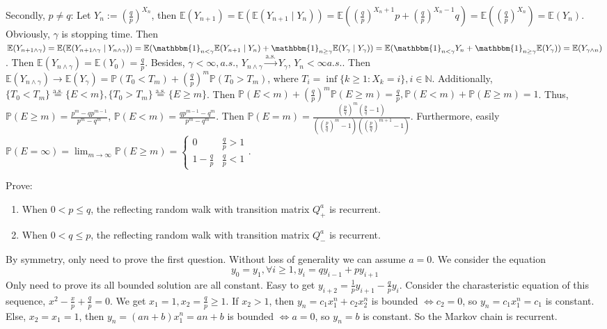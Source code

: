 \documentclass{ctexart}
\begin{document}
\begin{solution}
  Secondly, \(p \neq q\): Let \(Y_n:=(\frac{q}{p})^{X_n}\), then \(\mathbb{E}(Y_{n + 1})=\mathbb{E}(\mathbb{E}(Y_{n + 1} \mid Y_n))=\mathbb{E}((\frac{q}{p})^{X_n + 1} p+(\frac{q}{p})^{X_n-1}q )=\mathbb{E}((\frac{q}{p})^{X_n})=\mathbb{E}(Y_n)\).
  Obviously, \(\gamma\) is stopping  time.
  Then \(\mathbb{E}(Y_{n + 1 \wedge \gamma})=\mathbb{E}(\mathbb{E}(Y_{n + 1 \wedge \gamma} \mid Y_{n \wedge \gamma}))=\mathbb{E}(\mathbbm{1}_{n < \gamma}\mathbb{E}(Y_{n + 1} \mid Y_n) + \mathbbm{1}_{n \geq \gamma} \mathbb{E}(Y_{\gamma} \mid Y_\gamma))=\mathbb{E}(\mathbbm{1}_{n < \gamma}Y_n + \mathbbm{1}_{n \geq \gamma}\mathbb{E}(Y_{\gamma}))=\mathbb{E}(Y_{\gamma \wedge n})\).
  Then \(\mathbb{E}(Y_{n \wedge \gamma})= \mathbb{E}(Y_0)=\frac{q}{p}\). Besides, \(\gamma < \infty, a. s.\), \(Y_{n \wedge \gamma} \overset{\text{a.s.}}{\to} Y_{\gamma} \), \(Y_n < \infty a. s.\).
  Then \(\mathbb{E}(Y_{n \wedge \gamma}) \to \mathbb{E}(Y_{\gamma})=\mathbb{P}(T_0 < T_m) + (\frac{q}{p})^m \mathbb{P}(T_0 > T_m)\), where \(T_i=\inf \{k \geq 1: X_k=i\}, i \in \mathbb{N}\).
  Additionally, \(\{T_0 < T_m\}\overset{\text{a.s.}}{=}\{E <m\}, \{T_0 > T_m\}\overset{\text{a.s.}}{=}\{E \geq m\}\).
  Then \(\mathbb{P}(E < m) + (\frac{q}{p})^m \mathbb{P}(E \geq m)= \frac{q}{p}, \mathbb{P}(E < m) + \mathbb{P}(E \geq m) =1\).
  Thus, \(\mathbb{P}(E \geq m) = \frac{p^m-qp^{m-1}}{p^m-q^m}\), \(\mathbb{P}(E < m)=\frac{qp^{m-1}-q^m}{p^m-q^m}\).
  Then \(\mathbb{P}(E=m)=\frac{(\frac{p}{q})^m(\frac{p}{q}-1)}{((\frac{p}{q})^m-1)((\frac{p}{q})^{m+1}-1)}\).
  Furthermore, easily \(\mathbb{P}(E=\infty)=\lim_{m \to \infty}\mathbb{P}(E \geq m)=\begin{cases}
    0             & \frac{q}{p}>1 \\
    1-\frac{q}{p} & \frac{q}{p}<1
  \end{cases}\).
\end{solution}

\begin{problem}\label{pro:3}
  Prove:
  \begin{enumerate}
    \item When \(0 < p \leq q\), the reflecting random walk with transition matrix \(Q^a_+\) is recurrent.
    \item When \(0 < q \leq p\), the reflecting random walk with transition matrix \(Q^a_-\) is recurrent.
  \end{enumerate}
\end{problem}
\begin{solution}
  By symmetry, only need to prove the first question. Without loss of generality we can assume \(a=0\).
  We consider the equation
  \[
    y_0=y_1,\forall i \geq 1,y_i=qy_{i-1}+py_{i+1}
  \]
  Only need to prove its all bounded solution are all constant.
  Easy to get \(y_{i+2}=\frac{1}{p}y_{i+1}-\frac{q}{p}y_{i}\).
  Consider the charasteristic equation of this sequence, \(x^2-\frac{x}{p}+\frac{q}{p}=0\).
  We get \(x_1=1,x_2=\frac{q}{p} \geq 1\).
  If \(x_2>1\), then \(y_n=c_1 x_1^n + c_2 x_2^n\) is bounded \(\iff c_2=0\), so \(y_n=c_1 x_1^n=c_1\) is constant.
  Else, \(x_2=x_1=1\), then \(y_n=(an+b)x_1^n=an+b\) is bounded \(\iff a=0\), so \(y_n=b\) is constant.
  So the Markov chain is recurrent.
\end{solution}
\end{document}
